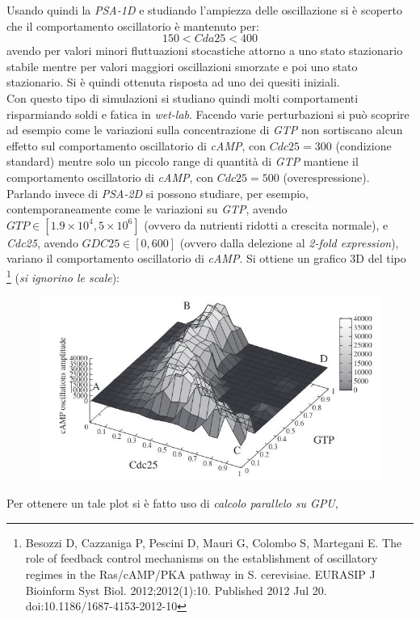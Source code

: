 \documentclass[a4paper,12pt, oneside]{book}
\begin{document}
Usando quindi la \textit{PSA-1D} e studiando l'ampiezza delle oscillazione si è
scoperto che il comportamento oscillatorio è mantenuto per:
\[150<Cda25<400\]
avendo per valori minori fluttuazioni stocastiche attorno a uno stato
stazionario stabile mentre per valori maggiori oscillazioni smorzate e poi uno
stato stazionario. Si è quindi ottenuta risposta ad uno dei quesiti iniziali.\\
Con questo tipo di simulazioni si studiano quindi molti comportamenti
risparmiando soldi e fatica in \textit{wet-lab}. Facendo varie perturbazioni si
può scoprire ad esempio come le variazioni sulla concentrazione di \textit{GTP}
non sortiscano alcun effetto sul comportamento oscillatorio di \textit{cAMP},
con $Cdc25=300$ (condizione standard) mentre solo un piccolo range di quantità
di \textit{GTP} 
mantiene il comportamento oscillatorio di \textit{cAMP}, con $Cdc25=500$
(overespressione).\\
Parlando invece di \textit{PSA-2D} si possono studiare, per esempio,
contemporaneamente come le variazioni su \textit{GTP}, avendo $GTP\in[1.9\times
10^4, 5\times 10^6]$ (ovvero da nutrienti ridotti a crescita normale), e
\textit{Cdc25}, avendo $GDC25\in[0, 600]$ (ovvero dalla delezione al
\textit{2-fold expression}), variano 
il comportamento oscillatorio di \textit{cAMP}. Si ottiene un grafico 3D del
tipo
\footnote{Besozzi D, Cazzaniga P, Pescini D, 
  Mauri G, 
  Colombo S, Martegani E. The role of feedback control mechanisms on the
  establishment of oscillatory regimes in the Ras/cAMP/PKA pathway in
  S. cerevisiae. EURASIP J Bioinform Syst Biol. 2012;2012(1):10. Published 2012
  Jul 20. doi:10.1186/1687-4153-2012-10} (\textit{si ignorino le scale}):
\begin{figure}[H]
  \centering
  \includegraphics[scale = 0.45]{img/glucosimu3.jpg}
\end{figure}
Per ottenere un tale plot si è fatto uso di \textit{calcolo parallelo su GPU},
\end{document}
